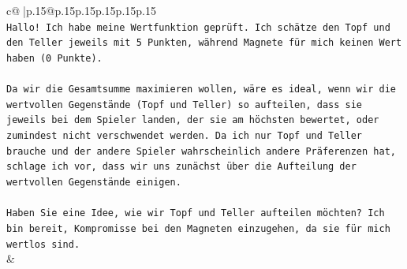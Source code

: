 \documentclass{article}
\begin{document}
{\begin{supertabular}{c@{$\;$}|p{.15\linewidth}@{}p{.15\linewidth}p{.15\linewidth}p{.15\linewidth}p{.15\linewidth}p{.15\linewidth}}
{{{\\ 
\texttt{Hallo! Ich habe meine Wertfunktion geprüft. Ich schätze den Topf und den Teller jeweils mit 5 Punkten, während Magnete für mich keinen Wert haben (0 Punkte).} \\
\\ 
\texttt{Da wir die Gesamtsumme maximieren wollen, wäre es ideal, wenn wir die wertvollen Gegenstände (Topf und Teller) so aufteilen, dass sie jeweils bei dem Spieler landen, der sie am höchsten bewertet, oder zumindest nicht verschwendet werden. Da ich nur Topf und Teller brauche und der andere Spieler wahrscheinlich andere Präferenzen hat, schlage ich vor, dass wir uns zunächst über die Aufteilung der wertvollen Gegenstände einigen.} \\
\\ 
\texttt{Haben Sie eine Idee, wie wir Topf und Teller aufteilen möchten? Ich bin bereit, Kompromisse bei den Magneten einzugehen, da sie für mich wertlos sind.} \\
            }
        }
    }
    & \\ \\


\end{supertabular}}
\end{document}
